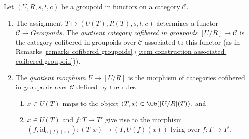 \begin{definition}
\label{definition-quotient}
Let $(U, R, s, t, c)$ be a groupoid in functors on a category $\mathcal{C}$.
\begin{enumerate}
\item The assignment $T \mapsto  (U(T), R(T), s, t, c)$ determines a functor
$\mathcal{C} \to \textit{Groupoids}$. The {\it quotient category
cofibered in groupoids $[U/R] \to \mathcal{C}$} is the category
cofibered in groupoids over $\mathcal{C}$ associated to this functor (as in
Remarks \ref{remarks-cofibered-groupoids}
(\ref{item-construction-associated-cofibered-groupoid})).
\item The {\it quotient morphism $U \to [U/R]$} is the morphism of
categories cofibered in groupoids over $\mathcal{C}$ defined by the
rules
\begin{enumerate}
\item $x \in U(T)$ maps to the object $(T, x) \in \Ob([U/R](T))$, and
\item $x \in U(T)$ and $f : T \to T'$ give rise to the morphism
$(f, \text{id}_{U(f)(x)}): (T, x) \to (T, U(f)(x))$ lying over
$f : T \to T'$.
\end{enumerate}
\end{enumerate}
\end{definition}